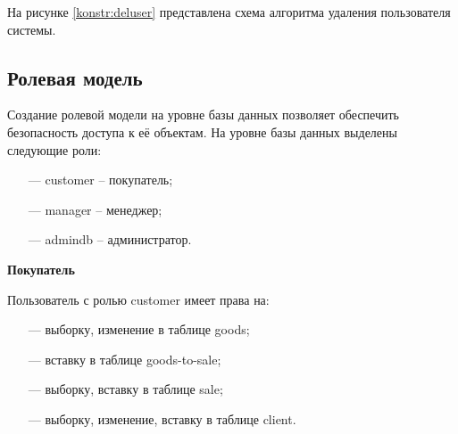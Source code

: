 На рисунке \ref{konstr:deluser} представлена схема алгоритма удаления пользователя системы.

\begin{figure}[H]
\end{figure}

\subsection{Ролевая модель}

Создание ролевой модели на уровне базы данных позволяет обеспечить безопасность доступа к её объектам. На уровне базы данных выделены следующие роли:

\begin{itemize}[leftmargin=0.7cm +  - ]
	\item[---] customer -- покупатель;
	\item[---] manager -- менеджер;
	\item[---] admindb -- администратор.
\end{itemize}

\textbf{Покупатель}

Пользователь с ролью customer имеет права на:

\begin{itemize}[leftmargin=0.7cm +  - ]
	\item[---] выборку, изменение в таблице goods;
	\item[---] вставку в таблице goods-to-sale;
	\item[---] выборку, вставку в таблице sale;
	\item[---] выборку, изменение, вставку в таблице client.
\end{itemize}

